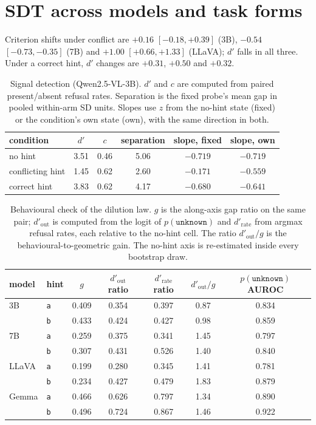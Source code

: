 \documentclass[10pt]{article}
\newcommand{\unknown}{\texttt{unknown}}
\newcommand{\punk}{p(\unknown)}
\begin{document}
\section{SDT across models and task forms}
\label{app:tasks}

Criterion shifts under conflict are $+0.16$ $[-0.18,+0.39]$ (3B), $-0.54$ $[-0.73,-0.35]$ (7B) and $+1.00$ $[+0.66,+1.33]$ (LLaVA); $d'$ falls in all three. Under a correct hint, $d'$ changes are $+0.31$, $+0.50$ and $+0.32$.

\begin{table}[h]
\centering
\small
\caption{Signal detection (Qwen2.5-VL-3B). $d'$ and $c$ are computed from paired present/absent refusal rates. Separation is the fixed probe's mean gap in pooled within-arm SD units. Slopes use $z$ from the no-hint state (fixed) or the condition's own state (own), with the same direction in both.}
\label{tab:sdt}
\begin{tabular}{lccccc}
\toprule
condition & $d'$ & $c$ & separation & slope, fixed & slope, own \\
\midrule
no hint & 3.51 & 0.46 & 5.06 & $-0.719$ & $-0.719$ \\
conflicting hint & 1.45 & 0.62 & 2.60 & $-0.171$ & $-0.559$ \\
correct hint & 3.83 & 0.62 & 4.17 & $-0.680$ & $-0.641$ \\
\bottomrule
\end{tabular}
\end{table}

\begin{table}[h]
\centering
\small
\caption{Behavioural check of the dilution law. $g$ is the along-axis gap ratio on the same pair; $d'_{\text{out}}$ is computed from the logit of $p(\unknown)$ and $d'_{\text{rate}}$ from argmax refusal rates, each relative to the no-hint cell. The ratio $d'_{\text{out}}/g$ is the behavioural-to-geometric gain. The no-hint axis is re-estimated inside every bootstrap draw.}
\label{tab:lawbeh}
\begin{tabular}{llccccc}
\toprule
model & hint & $g$ & $d'_{\text{out}}$ ratio & $d'_{\text{rate}}$ ratio & $d'_{\text{out}}/g$ & $\punk$ AUROC \\
\midrule
3B & \texttt{a} & 0.409 & 0.354 & 0.397 & 0.87 & 0.834 \\
   & \texttt{b} & 0.433 & 0.424 & 0.427 & 0.98 & 0.859 \\
7B & \texttt{a} & 0.259 & 0.375 & 0.341 & 1.45 & 0.797 \\
   & \texttt{b} & 0.307 & 0.431 & 0.526 & 1.40 & 0.840 \\
LLaVA & \texttt{a} & 0.199 & 0.280 & 0.345 & 1.41 & 0.781 \\
      & \texttt{b} & 0.234 & 0.427 & 0.479 & 1.83 & 0.879 \\
Gemma & \texttt{a} & 0.466 & 0.626 & 0.797 & 1.34 & 0.890 \\
      & \texttt{b} & 0.496 & 0.724 & 0.867 & 1.46 & 0.922 \\
\bottomrule
\end{tabular}
\end{table}
\end{document}
